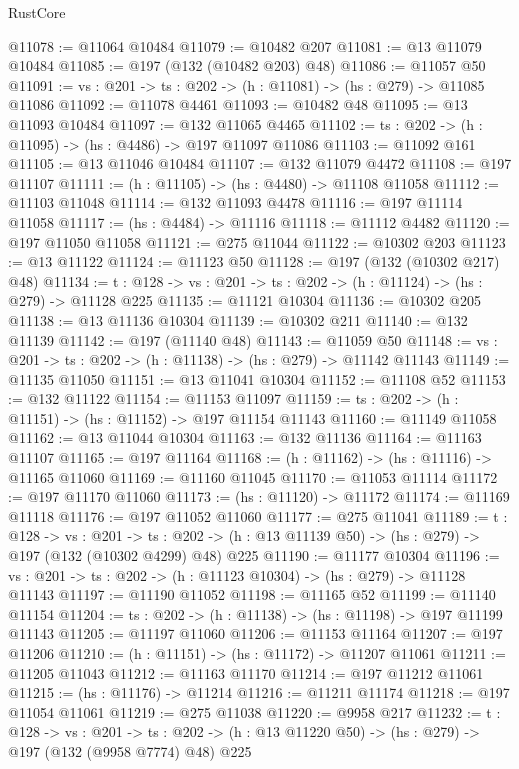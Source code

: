\begin{lexlean}{RustCore}
\begin{coremodule}
@11078 := @11064 @10484
@11079 := @10482 @207
@11081 := @13 @11079 @10484
@11085 := @197 (@132 (@10482 @203) @48)
@11086 := @11057 @50
@11091 := {vs : @201} -> {ts : @202} -> (h : @11081) -> (hs : @279) -> @11085 @11086
@11092 := @11078 @4461
@11093 := @10482 @48
@11095 := @13 @11093 @10484
@11097 := @132 @11065 @4465
@11102 := {ts : @202} -> (h : @11095) -> (hs : @4486) -> @197 @11097 @11086
@11103 := @11092 @161
@11105 := @13 @11046 @10484
@11107 := @132 @11079 @4472
@11108 := @197 @11107
@11111 := (h : @11105) -> (hs : @4480) -> @11108 @11058
@11112 := @11103 @11048
@11114 := @132 @11093 @4478
@11116 := @197 @11114 @11058
@11117 := (hs : @4484) -> @11116
@11118 := @11112 @4482
@11120 := @197 @11050 @11058
@11121 := @275 @11044
@11122 := @10302 @203
@11123 := @13 @11122
@11124 := @11123 @50
@11128 := @197 (@132 (@10302 @217) @48)
@11134 := {t : @128} -> {vs : @201} -> {ts : @202} -> (h : @11124) -> (hs : @279) -> @11128 @225
@11135 := @11121 @10304
@11136 := @10302 @205
@11138 := @13 @11136 @10304
@11139 := @10302 @211
@11140 := @132 @11139
@11142 := @197 (@11140 @48)
@11143 := @11059 @50
@11148 := {vs : @201} -> {ts : @202} -> (h : @11138) -> (hs : @279) -> @11142 @11143
@11149 := @11135 @11050
@11151 := @13 @11041 @10304
@11152 := @11108 @52
@11153 := @132 @11122
@11154 := @11153 @11097
@11159 := {ts : @202} -> (h : @11151) -> (hs : @11152) -> @197 @11154 @11143
@11160 := @11149 @11058
@11162 := @13 @11044 @10304
@11163 := @132 @11136
@11164 := @11163 @11107
@11165 := @197 @11164
@11168 := (h : @11162) -> (hs : @11116) -> @11165 @11060
@11169 := @11160 @11045
@11170 := @11053 @11114
@11172 := @197 @11170 @11060
@11173 := (hs : @11120) -> @11172
@11174 := @11169 @11118
@11176 := @197 @11052 @11060
@11177 := @275 @11041
@11189 := {t : @128} ->
  {vs : @201} ->
  {ts : @202} -> (h : @13 @11139 @50) -> (hs : @279) -> @197 (@132 (@10302 @4299) @48) @225
@11190 := @11177 @10304
@11196 := {vs : @201} -> {ts : @202} -> (h : @11123 @10304) -> (hs : @279) -> @11128 @11143
@11197 := @11190 @11052
@11198 := @11165 @52
@11199 := @11140 @11154
@11204 := {ts : @202} -> (h : @11138) -> (hs : @11198) -> @197 @11199 @11143
@11205 := @11197 @11060
@11206 := @11153 @11164
@11207 := @197 @11206
@11210 := (h : @11151) -> (hs : @11172) -> @11207 @11061
@11211 := @11205 @11043
@11212 := @11163 @11170
@11214 := @197 @11212 @11061
@11215 := (hs : @11176) -> @11214
@11216 := @11211 @11174
@11218 := @197 @11054 @11061
@11219 := @275 @11038
@11220 := @9958 @217
@11232 := {t : @128} ->
  {vs : @201} ->
  {ts : @202} -> (h : @13 @11220 @50) -> (hs : @279) -> @197 (@132 (@9958 @7774) @48) @225

\end{coremodule}
\end{lexlean}
